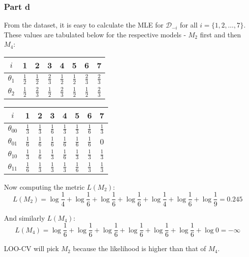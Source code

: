 \documentclass{article}
\begin{document}
\subsubsection*{Part d}
\begin{flushleft}
From the dataset, it is easy to calculate the MLE for \(\mathcal{D}_{-i}\) for all \(i = \{1, 2, \ldots, 7\}\). These values are tabulated below for the respective models - \(M_{2}\) first and then \(M_{4}\):
\begin{center}
\begin{tabular}{c|ccccccc}
\(i\) & 1 & 2 & 3 & 4 & 5 & 6 & 7 \\
\hline
\(\theta_{1}\) & \(\frac{1}{2}\) & \(\frac{1}{2}\) & \(\frac{2}{3}\) & \(\frac{1}{2}\) & \(\frac{1}{2}\) & \(\frac{2}{3}\) & \(\frac{2}{3}\) \\
\(\theta_{2}\) & \(\frac{1}{2}\) & \(\frac{2}{3}\) & \(\frac{1}{2}\) & \(\frac{2}{3}\) & \(\frac{1}{2}\) & \(\frac{1}{2}\) & \(\frac{2}{3}\) \\
\end{tabular}
\end{center}

\begin{center}
\begin{tabular}{c|ccccccc}
\(i\) & 1 & 2 & 3 & 4 & 5 & 6 & 7 \\
\hline
\(\theta_{00}\) & \(\frac{1}{3}\) & \(\frac{1}{3}\) & \(\frac{1}{6}\) & \(\frac{1}{3}\) & \(\frac{1}{3}\) & \(\frac{1}{6}\) & \(\frac{1}{3}\) \\
\(\theta_{01}\) & \(\frac{1}{6}\) & \(\frac{1}{6}\) & \(\frac{1}{6}\) & \(\frac{1}{6}\) & \(\frac{1}{6}\) & \(\frac{1}{6}\) & \(0\) \\
\(\theta_{10}\) & \(\frac{1}{3}\) & \(\frac{1}{6}\) & \(\frac{1}{3}\) & \(\frac{1}{6}\) & \(\frac{1}{3}\) & \(\frac{1}{3}\) & \(\frac{1}{3}\) \\
\(\theta_{11}\) & \(\frac{1}{6}\) & \(\frac{1}{3}\) & \(\frac{1}{3}\) & \(\frac{1}{3}\) & \(\frac{1}{6}\) & \(\frac{1}{3}\) & \(\frac{1}{3}\) \\
\end{tabular}
\end{center}

Now computing the metric \(L(M_{2})\):
\begin{equation}
L(M_{2}) = \log\frac{1}{4} + \log\frac{1}{6} + \log\frac{1}{6} + \log\frac{1}{6} + \log\frac{1}{4} + \log\frac{1}{6} + \log\frac{1}{9} = 0.245
\end{equation}

And similarly \(L(M_{4})\):
\begin{equation}
L(M_{4}) = \log\frac{1}{6} + \log\frac{1}{6} + \log\frac{1}{6} + \log\frac{1}{6} + \log\frac{1}{6} + \log\frac{1}{6} + \log 0 = -\infty
\end{equation}

LOO-CV will pick \(M_{2}\) because the likelihood is higher than that of \(M_{4}\).
\end{flushleft}
\end{document}
